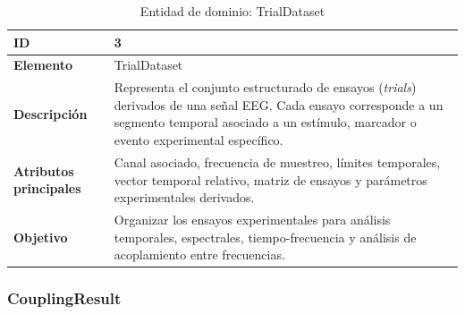 \documentclass[12pt, letterpaper]{article}
\begin{document}
\begin{table}[H]
\centering

\begin{tabularx}{\textwidth}{|
>{}p{3.9cm}|
Y|
}

\hline
\textbf{ID} & 3 \\ \hline

\textbf{Elemento} & TrialDataset \\ \hline

\textbf{Descripción}
&
Representa el conjunto estructurado de ensayos (\textit{trials}) derivados
de una señal EEG. Cada ensayo corresponde a un segmento temporal asociado a
un estímulo, marcador o evento experimental específico.
\\ \hline

\textbf{Atributos principales}
&
Canal asociado, frecuencia de muestreo, límites temporales, vector temporal
relativo, matriz de ensayos y parámetros experimentales derivados.
\\ \hline

\textbf{Objetivo}
&
Organizar los ensayos experimentales para análisis temporales, espectrales, tiempo-frecuencia y análisis de
acoplamiento entre frecuencias.
\\ \hline

\end{tabularx}

\caption{Entidad de dominio: TrialDataset}
\label{tab:trialdataset}

\end{table}

\subsubsection{CouplingResult}
\end{document}
